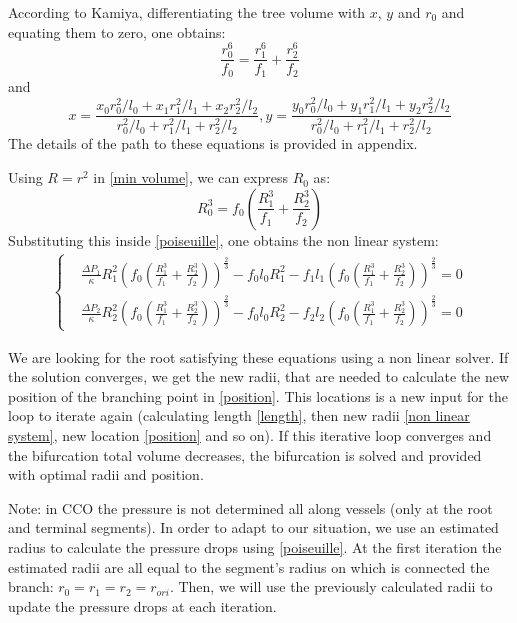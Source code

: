 \documentclass[a4paper, 11pt]{article} %
\begin{document}
According to  Kamiya, differentiating the tree volume with $x$, $y$ and $r_0$ and equating them to zero, one obtains:
\begin{equation}
\frac{r_0^6}{f_0} = \frac{r_1^6}{f_1} + \frac{r_2^6}{f_2}
\label{min volume}
\end{equation}
and 
\begin{equation}
x = \frac{x_0 r_0^2/l_0 + x_1 r_1^2/l_1 + x_2 r_2^2/l_2}{r_0^2/l_0 + r_1^2/l_1 + r_2^2 / l_2},
y = \frac{y_0 r_0^2/l_0 + y_1 r_1^2/l_1 + y_2 r_2^2/l_2}{r_0^2/l_0 + r_1^2/l_1 + r_2^2 / l_2}
\label{position}
\end{equation}
The details of the path to these equations is provided in appendix.

Using $R = r^2$ in \eqref{min volume}, we can express $R_0$ as:
\begin{equation}
R_0^3 = f_0(\frac{R_1^3}{f_1} + \frac{R_2^3}{f_2})
\end{equation} 
Substituting this inside \eqref{poiseuille}, one obtains the non linear system:
\begin{align}
\begin{cases}
&\frac{\Delta P_1}{\kappa}R_1^2 \left(f_0(\frac{R_1^3}{f_1} + \frac{R_2^3}{f_2}) \right)^\frac{2}{3} -f_0l_0R_1^2 - f_1l_1\left(f_0(\frac{R_1^3}{f_1} + \frac{R_2^3}{f_2}) \right)^\frac{2}{3} = 0 \\
&\frac{\Delta P_2}{\kappa}R_2^2 \left(f_0(\frac{R_1^3}{f_1} + \frac{R_2^3}{f_2}) \right)^\frac{2}{3} -f_0l_0R_2^2 - f_2l_2\left(f_0(\frac{R_1^3}{f_1} + \frac{R_2^3}{f_2}) \right)^\frac{2}{3} = 0
\end{cases}
\label{non linear system}
\end{align}

We are looking for the root satisfying these equations using a non linear solver. If the solution converges, we get the new radii, that are needed to calculate the new position of the branching point in \eqref{position}. This locations is a new input for the loop to iterate again (calculating length \eqref{length}, then new radii \eqref{non linear system}, new location \eqref{position} and so on). 
If this iterative loop converges and the bifurcation total volume decreases, the bifurcation is solved and provided with optimal radii and position.

Note: in CCO the pressure is not determined all along vessels (only at the root and terminal segments). In order to adapt to our situation, we use an estimated radius to calculate the pressure drops using \eqref{poiseuille}. At the first iteration the estimated radii are all equal to the segment's radius on which is connected the branch: $r_0 = r_1 = r_2 = r_{ori}$.
Then, we will use the previously calculated radii to update the pressure drops at each iteration.
\end{document}
